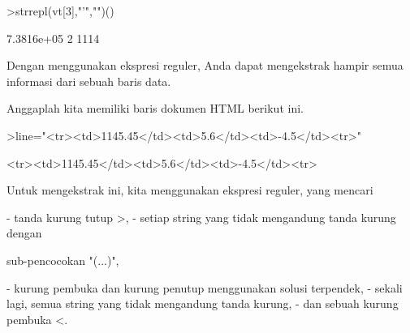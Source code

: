 \documentclass[a4paper,10pt]{article}
\begin{document}
\begin{eulernotebook}
\begin{eulercomment}
\begin{eulercomment}
\begin{eulercomment}
\begin{eulercomment}
\begin{eulercomment}
\begin{eulercomment}
\begin{eulerprompt}
>strrepl(vt[3],"'","")()
\end{eulerprompt}
\begin{euleroutput}
  7.3816e+05
  2
  1114
\end{euleroutput}
\begin{eulercomment}
Dengan menggunakan ekspresi reguler, Anda dapat mengekstrak hampir
semua informasi dari sebuah baris data.

Anggaplah kita memiliki baris dokumen HTML berikut ini.
\end{eulercomment}
\begin{eulerprompt}
>line="<tr><td>1145.45</td><td>5.6</td><td>-4.5</td><tr>"
\end{eulerprompt}
\begin{euleroutput}
  <tr><td>1145.45</td><td>5.6</td><td>-4.5</td><tr>
\end{euleroutput}
\begin{eulercomment}
Untuk mengekstrak ini, kita menggunakan ekspresi reguler, yang mencari

\end{eulercomment}
\begin{eulerttcomment}
 - tanda kurung tutup >,
 - setiap string yang tidak mengandung tanda kurung dengan
\end{eulerttcomment}
\begin{eulercomment}
sub-pencocokan "(...)",\\
\end{eulercomment}
\begin{eulerttcomment}
 - kurung pembuka dan kurung penutup menggunakan solusi terpendek,
 - sekali lagi, semua string yang tidak mengandung tanda kurung,
 - dan sebuah kurung pembuka <.
\end{eulerttcomment}
\begin{eulercomment}


\end{eulercomment}
\end{eulercomment}
\end{eulercomment}
\end{eulercomment}
\end{eulercomment}
\end{eulercomment}
\end{eulercomment}
\end{eulernotebook}
\end{document}
